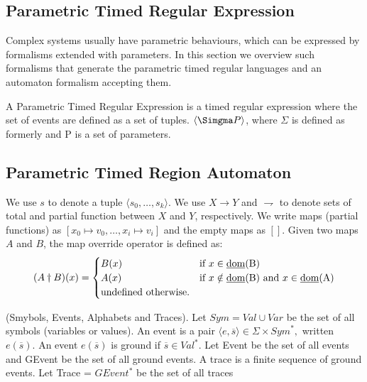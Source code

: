 			
		\subsection{Parametric Timed Regular Expression}
			Complex systems usually have parametric behaviours, which can be expressed by formalisms extended with parameters. In this section we overview such formalisms
			that generate the parametric timed regular languages and an automaton formalism accepting them.
			
			\begin{dfn}
			A Parametric Timed Regular Expression is a timed regular expression where the set of events are defined as a set of tuples. $\langle \Simgma P \rangle$,
			where $\Sigma$ is defined as formerly and P is a set of parameters.
			\end{dfn}
		
			\subsection{Parametric Timed Region Automaton}
				
				
				We use $s$ to denote a tuple $\langle s_0,\dots,s_k \rangle$. We use $X \rightarrow Y$ and $\rightharpoondown$ to denote sets of total and partial function between
				$X$ and $Y$, respectively. We write maps (partial functions) as $[x_0 \mapsto v_0,\dots,x_i \mapsto v_i]$ and the empty maps as $[]$. Given two maps $A$ and $B$,
				the map override operator is defined as:
					\[
					 (A \dagger B)(x) = 
					  \begin{cases} 
					   B(x) & \text{if } x \in \text{\underline{dom}(B)} \\
					   A(x) & \text{if } x \notin \text{\underline{dom}(B)} \text{ and } x \in \text{\underline{dom}(A)} \\
					   \text{undefined otherwise.}
					  \end{cases}
					\]
				
				\begin{dfn}
					(Smybols, Events, Alphabets and Traces).
					Let $\mathit{Sym} = \mathit{Val} \cup \mathit{Var}$ be the set of all symbols (variables or values).
					An event is a pair $\langle e, \overline{s} \rangle \in \Sigma \times \mathit{Sym}^\ast,$ written $e(\overline{s})$.
					An event $e(\overline{s})$ is ground if $\overline{s} \in \mathit{Val}^\ast$.
					Let Event be the set of all events and GEvent be the set of all ground events.
					A trace is a finite sequence of ground events.
					Let Trace = $GEvent^\ast$ be the set of all traces
				\end{dfn}
				
